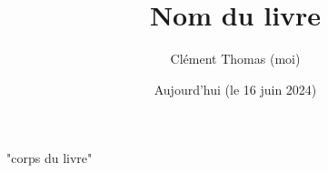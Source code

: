 \documentclass[a4paper, 11pt]{book}
\title{Nom du livre}
\author{Clément Thomas (moi)}
\date{Aujourd'hui (le 16 juin 2024)} %
\begin{document}
\maketitle %
"corps du livre"

\tableofcontents %
\end{document}
